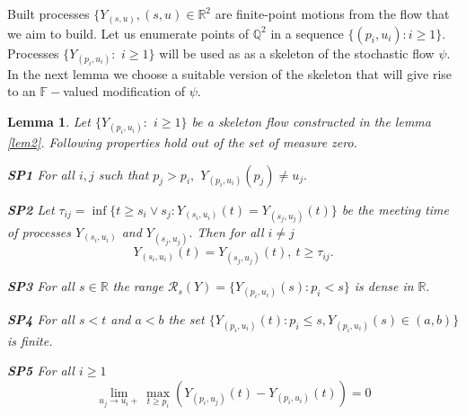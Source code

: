 \documentclass[a4paper,12pt]{article}
\newcommand{\1}{1\!\!\,{\rm I}}
\theoremstyle{plain}
\newtheorem{lemma}{Lemma}[section]
\begin{document}
Built processes $\{Y_{(s,u)}, (s,u)\in\mathbb{R}^2$ are finite-point motions from the flow that we aim to build. Let us enumerate points of $\mathbb{Q}^2$ in a sequence $\{(p_i,u_i):i\geq 1\}.$  Processes $\{Y_{(p_i,u_i)}:$ $i\geq 1\}$ will be used as as a skeleton of the stochastic flow $\psi$. In the next lemma we choose a suitable version of the skeleton that will give rise to an $\mathbb{F}-$valued modification of $\psi.$  


\begin{lemma}
	\label{lem3} Let $\{Y_{(p_i,u_i)}:$ $i\geq 1\}$ be a skeleton flow constructed in the lemma \ref{lem2}. 	Following properties hold out of the set of measure zero. 
	
	{\bf SP1} For all $i,j$ such that $p_j>p_i,$ $	Y_{(p_i,u_i)}(p_j)\ne u_j.$
	
	{\bf SP2} Let $\tau_{ij}=\inf\{t\geq s_i\vee s_j: Y_{(s_i,u_i)}(t)=Y_{(s_j,u_j)}(t)\}$ be the meeting time of processes $Y_{(s_i,u_i)}$ and $Y_{(s_j,u_j)}.$ Then  for all $i\ne j$
	$$
	Y_{(s_i,u_i)}(t)=Y_{(s_j,u_j)}(t), \ t\geq \tau_{ij}.
	$$
	
	{\bf SP3} For all $s\in \mathbb{R}$ the range $\mathcal{R}_s(Y)=\{Y_{(p_i,u_i)}(s):p_i<s\}$ is dense in $\mathbb{R}.$
	
	{\bf SP4} For all $s<t$ and $a<b$ the set $	\{Y_{(p_i,u_i)}(t):p_i\leq s, Y_{(p_i,u_i)}(s)\in(a,b)\} $	is finite.
	
	{\bf SP5} For all $i\geq 1$
	$$
	\lim_{u_j\to u_i+}\max_{t\geq p_i} (Y_{(p_i,u_j)}(t)-Y_{(p_i,u_i)}(t))= 0
	$$
	
\end{lemma}
\end{document}
